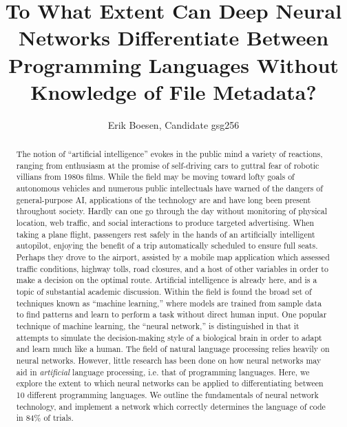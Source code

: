 \documentclass{article}
\begin{document}
\title{To What Extent Can Deep Neural Networks Differentiate Between Programming Languages Without Knowledge of File Metadata?}
\author{Erik Boesen, Candidate gsg256}
\maketitle

\begin{abstract}
    The notion of ``artificial intelligence'' evokes in the public mind a variety of reactions, ranging from enthusiasm at the promise of self-driving cars to guttral fear of robotic villians from 1980s films. While the field may be moving toward lofty goals of autonomous vehicles and numerous public intellectuals have warned of the dangers of general-purpose AI, applications of the technology are and have long been present throughout society. Hardly can one go through the day without monitoring of physical location, web traffic, and social interactions to produce targeted advertising. When taking a plane flight, passengers rest safely in the hands of an artificially intelligent autopilot, enjoying the benefit of a trip automatically scheduled to ensure full seats. Perhaps they drove to the airport, assisted by a mobile map application which assessed traffic conditions, highway tolls, road closures, and a host of other variables in order to make a decision on the optimal route. Artificial intelligence is already here, and is a topic of substantial academic discussion. Within the field is found the broad set of techniques known as ``machine learning,'' where models are trained from sample data to find patterns and learn to perform a task without direct human input. One popular technique of machine learning, the ``neural network,'' is distinguished in that it attempts to simulate the decision-making style of a biological brain in order to adapt and learn much like a human. The field of natural language processing relies heavily on neural networks. However, little research has been done on how neural networks may aid in \textit{artificial} language processing, i.e. that of programming languages. Here, we explore the extent to which neural networks can be applied to differentiating between 10 different programming languages. We outline the fundamentals of neural network technology, and implement a network which correctly determines the language of code in 84\% of trials.
\end{abstract}
\end{document}
